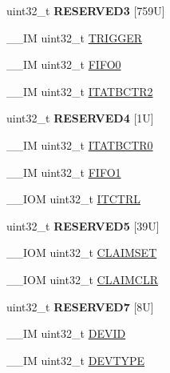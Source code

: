 \begin{DoxyCompactItemize}
\item 
\mbox{\label{structTPI__Type_a19254af92003a2007715754e67ffc625}} 
uint32\+\_\+t {\bfseries R\+E\+S\+E\+R\+V\+E\+D3} \mbox{[}759\+U\mbox{]}
\item 
\+\_\+\+\_\+\+IM uint32\+\_\+t \mbox{\hyperlink{structTPI__Type_a4d4cd2357f72333a82a1313228287bbd}{T\+R\+I\+G\+G\+ER}}
\item 
\+\_\+\+\_\+\+IM uint32\+\_\+t \mbox{\hyperlink{structTPI__Type_aa4d7b5cf39dff9f53bf7f69bc287a814}{F\+I\+F\+O0}}
\item 
\+\_\+\+\_\+\+IM uint32\+\_\+t \mbox{\hyperlink{structTPI__Type_ab358319b969d3fed0f89bbe33e9f1652}{I\+T\+A\+T\+B\+C\+T\+R2}}
\item 
\mbox{\label{structTPI__Type_a972a3b0bbe1bceb70171b2a3529eaeff}} 
uint32\+\_\+t {\bfseries R\+E\+S\+E\+R\+V\+E\+D4} \mbox{[}1\+U\mbox{]}
\item 
\+\_\+\+\_\+\+IM uint32\+\_\+t \mbox{\hyperlink{structTPI__Type_aaa573b2e073e76e93c51ecec79c616d0}{I\+T\+A\+T\+B\+C\+T\+R0}}
\item 
\+\_\+\+\_\+\+IM uint32\+\_\+t \mbox{\hyperlink{structTPI__Type_a061372fcd72f1eea871e2d9c1be849bc}{F\+I\+F\+O1}}
\item 
\+\_\+\+\_\+\+I\+OM uint32\+\_\+t \mbox{\hyperlink{structTPI__Type_aaa4c823c10f115f7517c82ef86a5a68d}{I\+T\+C\+T\+RL}}
\item 
\mbox{\label{structTPI__Type_a198d726053e26a795f818ed0aa8544c5}} 
uint32\+\_\+t {\bfseries R\+E\+S\+E\+R\+V\+E\+D5} \mbox{[}39\+U\mbox{]}
\item 
\+\_\+\+\_\+\+I\+OM uint32\+\_\+t \mbox{\hyperlink{structTPI__Type_af8b7d15fa5252b733dd4b11fa1b5730a}{C\+L\+A\+I\+M\+S\+ET}}
\item 
\+\_\+\+\_\+\+I\+OM uint32\+\_\+t \mbox{\hyperlink{structTPI__Type_a0e10e292cb019a832b03ddd055b2f6ac}{C\+L\+A\+I\+M\+C\+LR}}
\item 
\mbox{\label{structTPI__Type_a86c2c07941016ecbdf2f0ec959c7b2bd}} 
uint32\+\_\+t {\bfseries R\+E\+S\+E\+R\+V\+E\+D7} \mbox{[}8\+U\mbox{]}
\item 
\+\_\+\+\_\+\+IM uint32\+\_\+t \mbox{\hyperlink{structTPI__Type_abc0ecda8a5446bc754080276bad77514}{D\+E\+V\+ID}}
\item 
\+\_\+\+\_\+\+IM uint32\+\_\+t \mbox{\hyperlink{structTPI__Type_ad98855854a719bbea33061e71529a472}{D\+E\+V\+T\+Y\+PE}}
\end{DoxyCompactItemize}


